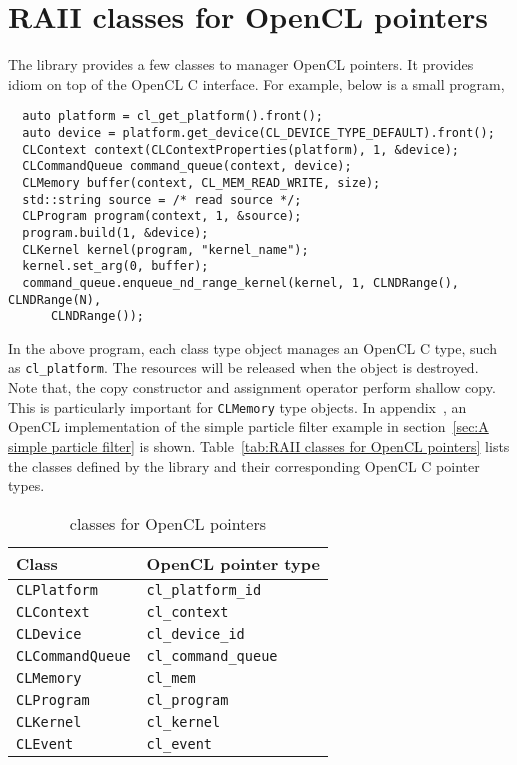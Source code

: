 \section{RAII classes for OpenCL pointers}
\label{sec:RAII classes for OpenCL pointers}

The library provides a few classes to manager OpenCL pointers. It provides
\raii idiom on top of the OpenCL C interface. For example, below is a small
program,
\begin{Verbatim}
  auto platform = cl_get_platform().front();
  auto device = platform.get_device(CL_DEVICE_TYPE_DEFAULT).front();
  CLContext context(CLContextProperties(platform), 1, &device);
  CLCommandQueue command_queue(context, device);
  CLMemory buffer(context, CL_MEM_READ_WRITE, size);
  std::string source = /* read source */;
  CLProgram program(context, 1, &source);
  program.build(1, &device);
  CLKernel kernel(program, "kernel_name");
  kernel.set_arg(0, buffer);
  command_queue.enqueue_nd_range_kernel(kernel, 1, CLNDRange(), CLNDRange(N),
      CLNDRange());
\end{Verbatim}
In the above program, each class type object manages an OpenCL C type, such as
\verb|cl_platform|. The resources will be released when the object is
destroyed. Note that, the copy constructor and assignment operator perform
shallow copy. This is particularly important for \verb|CLMemory| type objects.
In appendix~, an
OpenCL implementation of the simple particle filter example in
section~\ref{sec:A simple particle filter} is shown. Table~\ref{tab:RAII
  classes for OpenCL pointers} lists the classes defined by the library and
their corresponding OpenCL C pointer types.

\begin{table}
  \begin{tabularx}{\textwidth}{LL}
    \toprule
    Class & OpenCL pointer type \\
    \midrule
    \verb|CLPlatform|     & \verb|cl_platform_id|   \\
    \verb|CLContext|      & \verb|cl_context|       \\
    \verb|CLDevice|       & \verb|cl_device_id|     \\
    \verb|CLCommandQueue| & \verb|cl_command_queue| \\
    \verb|CLMemory|       & \verb|cl_mem|           \\
    \verb|CLProgram|      & \verb|cl_program|       \\
    \verb|CLKernel|       & \verb|cl_kernel|        \\
    \verb|CLEvent|        & \verb|cl_event|         \\
    \bottomrule
  \end{tabularx}
  \caption{\protect\raii classes for OpenCL pointers}
  \label{tab:RAII classes for OpenCL pointers}
\end{table}

